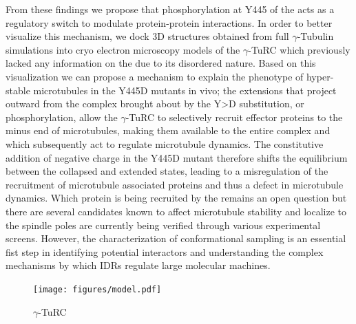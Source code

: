 \begin{figure}
\centering     %
{}
\label{fig:wells}
\end{figure}

From these findings we propose that phosphorylation at Y445 of the \gct{} acts as a regulatory switch to modulate protein-protein interactions. In order to better visualize this mechanism, we dock 3D structures obtained from full $\gamma$-Tubulin simulations into cryo electron microscopy models of the $\gamma$-TuRC  which previously lacked any information on the \gct{} due to its disordered nature. Based on this visualization we can propose a mechanism to explain the phenotype of hyper-stable microtubules in the Y445D mutants in vivo; the extensions that project outward from the complex brought about by the Y>D substitution, or phosphorylation, allow the $\gamma$-TuRC to selectively recruit effector proteins to the minus end of microtubules, making them available to the entire complex and which subsequently act to regulate microtubule dynamics. The constitutive addition of negative charge in the Y445D mutant therefore shifts the equilibrium between the collapsed and extended states, leading to a misregulation of the recruitment of microtubule associated proteins and thus a defect in microtubule dynamics. Which protein is being recruited by the \gct{} remains an open question but there are several candidates known to affect microtubule stability and localize to the spindle poles  are currently being verified through various experimental screens. However, the characterization of \gct{} conformational sampling  is an essential fist step in identifying potential interactors and understanding the complex mechanisms by which IDRs regulate large molecular machines.

\begin{figure}
\centering
\texttt{[image: figures/model.pdf]}
\caption{$\gamma$-TuRC}
\label{fig:turc}
\end{figure}